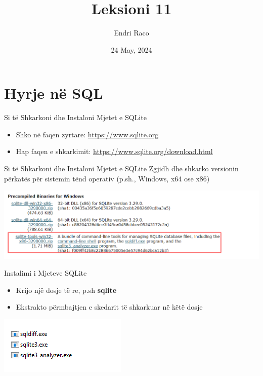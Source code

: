 \documentclass[
  ignorenonframetext,
]{beamer}
\title{Leksioni 11}
\author{Endri Raco}
\date{24 May, 2024}
\begin{document}
\frame{\titlepage}

\begin{frame}[allowframebreaks]
  \tableofcontents[hideallsubsections]
\end{frame}
\section{Hyrje në SQL}\label{hyrje-nuxeb-sql}

\begin{frame}{Si të Shkarkoni dhe Instaloni Mjetet e SQLite}
\label{si-tuxeb-shkarkoni-dhe-instaloni-mjetet-e-sqlite}
\begin{itemize}
\item
  Shko në faqen zyrtare: \url{https://www.sqlite.org}
\item
  Hap faqen e shkarkimit: \url{https://www.sqlite.org/download.html}
\end{itemize}
\end{frame}

\begin{frame}{Si të Shkarkoni dhe Instaloni Mjetet e SQLite}
\label{si-tuxeb-shkarkoni-dhe-instaloni-mjetet-e-sqlite-1}
Zgjidh dhe shkarko versionin përkatës për sistemin tënd operativ (p.sh.,
Windows, x64 ose x86)

\includegraphics{./Figs/sql.png}
\end{frame}

\begin{frame}{Instalimi i Mjeteve SQLite}
\label{instalimi-i-mjeteve-sqlite}
\begin{itemize}
\item
  Krijo një dosje të re, p.sh \textbf{sqlite}
\item
  Ekstrakto përmbajtjen e skedarit të shkarkuar në këtë dosje
\end{itemize}

\includegraphics{./Figs/sql2.png}
\end{frame}
\end{document}
